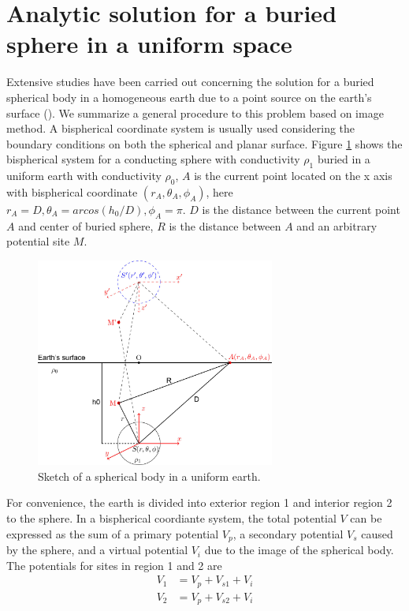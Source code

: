 \documentclass[11pt,letterpaper,leqno]{amsart}
\numberwithin{equation}{section}
\begin{document}
\section{Analytic solution for a buried sphere in a uniform space} 
Extensive studies have been carried out concerning the solution for a buried spherical body in a homogeneous earth due to a point source on the earth's surface (\citep{Nostrand1966,Large1971G,Merkel1971GP,Singh1976G,Snyder1973G,Tang2012}). We summarize a general procedure to this problem based on image method. A bispherical coordinate system  is usually used considering the boundary conditions on both the spherical and planar surface. 
Figure \ref{fig:sketch} shows the bispherical system for a conducting sphere with conductivity $\rho_1$ buried in a uniform earth with conductivity $\rho_0$, $A$ is the current point located on the x axis with bispherical coordinate $(r_A,\theta_A,\phi_A)$, here $r_A=D, \theta_A=arcos(h_0/D), \phi_A=\pi$. $D$ is the distance between the current point $A$ and center of buried sphere, $R$ is the distance between $A$ and an arbitrary potential site $M$. 
\begin{figure}[h!]
\centering
\includegraphics[width=0.7\textwidth]{sketch.jpg}
\caption{Sketch of a spherical body in a uniform earth.}
\label{fig:sketch}
\end{figure}
For convenience, the earth is divided into exterior region 1 and interior region 2 to the sphere.  In a bispherical coordiante system, the total potential $V$ can be expressed as the sum of a primary potential $V_p$, a secondary potential $V_s$ caused by the sphere, and a virtual potential $V_i$ due to the image of the spherical body. The potentials for sites in region 1 and 2 are
\begin{align}
V_1 &= V_p + V_{s1} + V_i \\
V_2 &= V_p + V_{s2} + V_i
\end{align}
\end{document}
